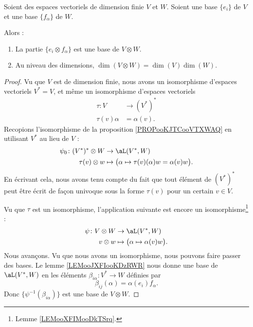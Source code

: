 \begin{proposition}      \label{PROPooTHDPooWgjUwk}
    Soient des espaces vectoriels de dimension finie \( V\) et \( W\). Soient une base \( \{e_i\}\) de \( V\) et une base \( \{f_{\alpha}\}\) de \( W\).
    
    Alors :
    \begin{enumerate}
        \item       \label{ITEMooQCILooUncdGl}
            La partie \( \{e_i\otimes f_{\alpha}\}\) est une base de \( V\otimes W\).
        \item
    Au niveau des dimensions, \( \dim(V\otimes W)=\dim(V)\dim(W)\).
    \end{enumerate}
\end{proposition}

\begin{proof}
    Vu que \( V\) est de dimension finie, nous avons un isomorphisme d'espaces vectoriels \( V^*=V\), et même un isomorphisme d'espaces vectoriels
    \begin{equation}
        \begin{aligned}
            \tau\colon V&\to (V^*)^* \\
            \tau(v)\alpha&=\alpha(v).
        \end{aligned}
    \end{equation}
    Recopions l'isomorphisme de la proposition \ref{PROPooKJTCooVTXWAQ} en utilisant \( V^*\) au lieu de \( V\) :
    \begin{equation}
        \begin{aligned}
            \psi_0\colon (V^*)^*\otimes W&\to \aL(V^*,W) \\
           \tau(v)\otimes w &\mapsto \big( \alpha\mapsto \tau(v)(\alpha)w =\alpha(v)w \big).
        \end{aligned}
    \end{equation}
    En écrivant cela, nous avons tenu compte du fait que tout élément de \( (V^*)^*\) peut être écrit de façon univoque sous la forme \( \tau(v)\) pour un certain \( v\in V\).

    Vu que \( \tau\) est un isomorphisme, l'application suivante est encore un isomorphisme\footnote{Lemme \ref{LEMooXFIMooDkTSrq}.} :
    \begin{equation}        \label{EQooAEFRooPfmAnj}
        \begin{aligned}
            \psi\colon V\otimes W&\to \aL(V^*,W) \\
            v\otimes w&\mapsto \big( \alpha\mapsto \alpha(v)w \big). 
        \end{aligned}
    \end{equation}
    Nous avançons. Vu que nous avons un isomorphisme, nous pouvons faire passer des bases. Le lemme \ref{LEMooJXFIooKDzRWR} nous donne une base de \( \aL(V^*,W)\) en les éléments \( \beta_{i\alpha}\colon V^*\to W\) définies par
    \begin{equation}
        \beta_{ij}(\alpha)=\alpha(e_i)f_{\alpha}.
    \end{equation}
    Donc \( \{ \psi^{-1}(\beta_{i\alpha}) \}\) est une base de \( V\otimes W\).


\end{proof}
